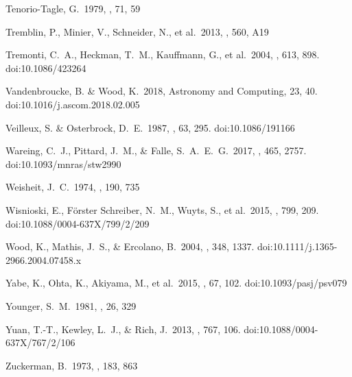 \documentclass[twocolumn]{aastex62}
\begin{document}
\begin{CJK*}{UTF8}{gbsn}
\begin{thebibliography}{}
 Tenorio-Tagle, G.\ 1979, \aap, 71, 59

 Tremblin, P., Minier, V., Schneider, N., et al.\ 2013, \aap, 560, A19

 Tremonti, C.~A., Heckman, T.~M., Kauffmann, G., et al.\ 2004, \apj, 613, 898. doi:10.1086/423264

 Vandenbroucke, B. \& Wood, K.\ 2018, Astronomy and Computing, 23, 40. doi:10.1016/j.ascom.2018.02.005

 Veilleux, S. \& Osterbrock, D.~E.\ 1987, \apjs, 63, 295. doi:10.1086/191166

 Wareing, C.~J., Pittard, J.~M., \& Falle, S.~A.~E.~G.\ 2017, \mnras, 465, 2757. doi:10.1093/mnras/stw2990

 Weisheit, J.~C.\ 1974, \apj, 190, 735

 Wisnioski, E., F{\"o}rster Schreiber, N.~M., Wuyts, S., et al.\ 2015, \apj, 799, 209. doi:10.1088/0004-637X/799/2/209

 Wood, K., Mathis, J.~S., \& Ercolano, B.\ 2004, \mnras, 348, 1337. doi:10.1111/j.1365-2966.2004.07458.x

 Yabe, K., Ohta, K., Akiyama, M., et al.\ 2015, \pasj, 67, 102. doi:10.1093/pasj/psv079

 Younger, S.~M.\ 1981, \jqsrt, 26, 329

 Yuan, T.-T., Kewley, L.~J., \& Rich, J.\ 2013, \apj, 767, 106. doi:10.1088/0004-637X/767/2/106

 Zuckerman, B.\ 1973, \apj, 183, 863

\end{thebibliography}



\end{CJK*}
\end{document}
